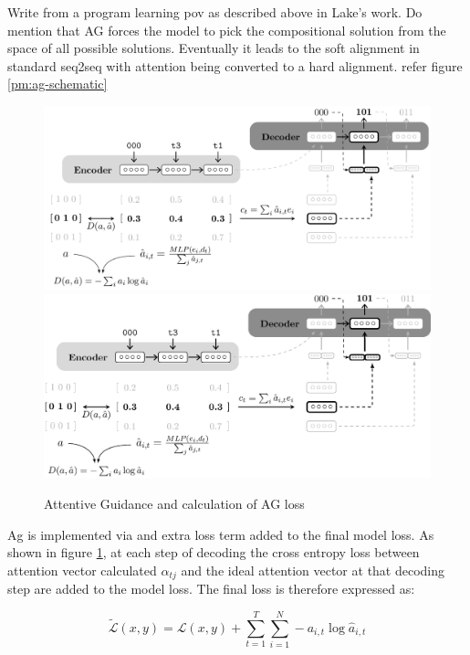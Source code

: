 Write from a program learning pov as described above in Lake's work. Do mention that AG forces the model to pick the compositional solution from the space of all possible solutions. Eventually it leads to the soft alignment in standard seq2seq with attention being converted to a hard alignment. refer figure \ref{pm:ag-schematic}

\begin{figure}
	\begin{minipage}[t]{\textwidth}
		\ifpdf
		\includegraphics[width=\linewidth,keepaspectratio=true]{./figs/ag-model-pdf}
		\else
		\includegraphics[width=\linewidth,keepaspectratio=true]{./figs/ag-model-eps}
		\fi
		\caption{\small Attentive Guidance and calculation of AG loss}
		\label{pm:ag-loss}
	\end{minipage}
\end{figure}

Ag is implemented via and extra loss term added to the final model loss. As shown in figure \ref{pm:ag-loss}, at each step of decoding the cross entropy loss between attention vector calculated $\alpha_{tj}$ and the ideal attention vector at that decoding step are added to the model loss. The final loss is therefore expressed as:

\begin{equation}
\widetilde{\mathcal{L}}(x,y) = \mathcal{L}(x,y) + \sum_{t=1}^T \sum_{i=1}^N -a_{i,t}\log\hat{a}_{i,t}
\end{equation}